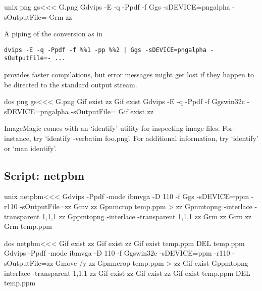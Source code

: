 \documentclass{article}
\begin{document}
\<unix png gs\><<<
 G.png
 Gdvips -E -q -Ppdf -f %
 Ggs -sDEVICE=pngalpha -sOutputFile=%
 Grm zz%

A piping of the conversion as in

\begin{verbatim}
dvips -E -q -Ppdf -f %%1 -pp %%2 | Ggs -sDEVICE=pngalpha -sOutputFile=- ...
\end{verbatim}

provides faster compilations, but error messages might get lost if
they happen to be directed to the standard output stream.


\<dos png gs\><<<
 G.png
 Gif exist zz%
 Gif exist %
 Gdvips -E -q -Ppdf -f %
 Ggswin32c -sDEVICE=pngalpha -sOutputFile=%
 Gif exist zz%




ImageMagic comes with an `identify' utility for inspecting image
files.  For instance, try `identify -verbatim foo.png'. For additional
information, try `identify' or `man identify'.


\subsection{Script: netpbm}



\<unix netpbm\><<<
Gdvips -Ppdf -mode ibmvga -D 110 -f %
Ggs -sDEVICE=ppm -r110 -sOutputFile=zz%
Gmv zz%
Gpnmcrop  temp.ppm > zz%
Gpnmtopng -interlace -transparent 1,1,1 zz%
 Gppmtopng -interlace -transparent 1,1,1 zz%
Grm zz%
Grm zz%
Grm temp.ppm


\<dos netpbm\><<<
Gif exist  zz%
Gif exist zz%
Gif exist temp.ppm DEL temp.ppm  
Gdvips -Ppdf -mode ibmvga -D 110 -f %
Ggswin32c -sDEVICE=ppm -r110 -sOutputFile=zz%
Gmove /y zz%
Gpnmcrop  temp.ppm > zz%
Gif exist %
Gppmtopng -interlace -transparent 1,1,1 zz%
Gif exist  zz%
Gif exist zz%
Gif exist temp.ppm DEL temp.ppm  
\end{document}
